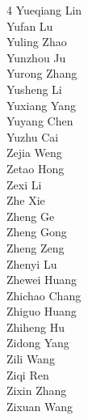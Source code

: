 \begin{multicols}{4}
Yueqiang Lin \\
Yufan Lu \\
Yuling Zhao \\
Yunzhou Ju \\
Yurong Zhang \\
Yusheng Li \\
Yuxiang Yang \\
Yuyang Chen \\
Yuzhu Cai \\
Zejia Weng \\
Zetao Hong \\
Zexi Li \\
Zhe Xie \\
Zheng Ge \\
Zheng Gong \\
Zheng Zeng \\
Zhenyi Lu \\
Zhewei Huang \\
Zhichao Chang \\
Zhiguo Huang \\
Zhiheng Hu \\
Zidong Yang \\
Zili Wang \\
Ziqi Ren \\
Zixin Zhang \\
Zixuan Wang \\
\end{multicols}
